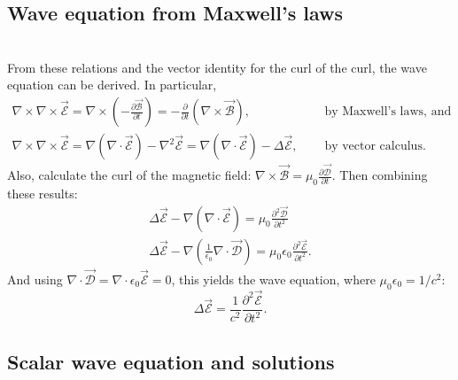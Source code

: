 \subsection{Wave equation from Maxwell's laws}~\\

From these relations and the vector identity for the curl of the curl, the wave equation can be derived.
In particular,
\begin{align}
  \nabla\times\nabla\times\vec{\mathcal{E}}=
  \nabla\times(-\frac{\partial \vec{\mathcal{B}}}{\partial t})=
  -\frac{\partial}{\partial t}(\nabla\times\vec{\mathcal{B}}),
  \quad&\text{ by Maxwell's laws, and}\\
  \nabla\times\nabla\times\vec{\mathcal{E}}=
  \nabla(\nabla\cdotp\vec{\mathcal{E}})-\nabla^2\vec{\mathcal{E}}=
  \nabla(\nabla\cdotp\vec{\mathcal{E}})-\Delta\vec{\mathcal{E}},
  \quad&\text{ by vector calculus.}
\end{align}
Also, calculate the curl of the magnetic field:
$\nabla\times\vec{\mathcal{B}}=\mu_0\frac{\partial\vec{\mathcal{D}}}{\partial t}$.
Then combining these results:
\begin{align}
  \Delta \vec{\mathcal{E}}-\nabla(\nabla\cdotp\vec{\mathcal{E}})=
  \mu_0\frac{\partial^2\vec{\mathcal{D}}}{\partial t^2}\\
  \Delta \vec{\mathcal{E}}-\nabla(\frac{1}{\epsilon_0}\nabla\cdotp\vec{\mathcal{D}})=
  \mu_0\epsilon_0\frac{\partial^2\vec{\mathcal{E}}}{\partial t^2}.
\end{align}
And using $\nabla\cdotp\vec{\mathcal{D}}=\nabla\cdotp\epsilon_0\vec{\mathcal{E}}=0$,
this yields the wave equation, where $\mu_0\epsilon_0=1/c^2$:
\begin{equation}
  \Delta\vec{\mathcal{E}}=\frac{1}{c^2}\frac{\partial^2\vec{\mathcal{E}}}{\partial t^2}.
\end{equation}

\subsection{Scalar wave equation and solutions}~\\

